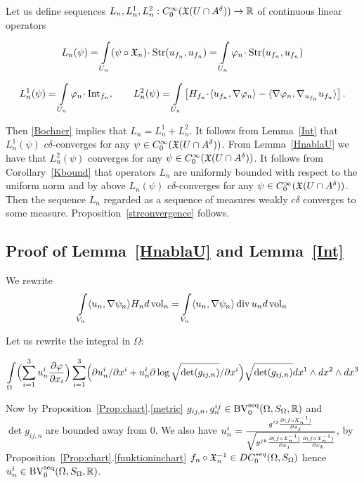 \documentclass[a4paper,10pt]{article}
\begin{document}
Let us define sequences 
$L_n, L_n^1, L_n^2:C^\infty_0(\X(U\cap A^\delta))\to \R$
of continuous linear operators

$$L_n(\psi)=
\int\limits_{U_n}(\psi\circ\mathfrak X_n )\cdot \Str(u_{f_n}, u_{f_n})=
\int\limits_{U_n} \phi_n\cdot \Str(u_{f_n}, u_{f_n})
$$

$$L_n^1(\psi)=
\int\limits_{U_n} \phi_n\cdot \Int_{f_n},
\qquad L_n^2(\psi)=
\int\limits_{U_n}
 \l[H_{f_n}\cdot\<u_{f_n},\nabla\phi_n\>- \<\nabla\phi_n,\nabla_{u_{f_n}} u_{f_n}\> \r].$$

Then \ref{Bochner} implies that $L_n=L_n^1+L_n^2$.
It follows from
Lemma~\ref{Int} that 
$L^1_n(\psi)$ $c\delta$-converges for any $\psi\in C^\infty_0(\X(U\cap A^\delta))$. From
Lemma~\ref{HnablaU} we have that
$L^2_n(\psi)$ converges for any $\psi\in C^\infty_0(\X(U\cap A^\delta))$.
It follows from Corollary~\ref{Kbound}  that operators $L_n$
are uniformly bounded with respect to the uniform norm and by above
$L_n(\psi)$ $c\delta$-converges for any $\psi\in C^\infty_0(\X(U\cap A^\delta))$.
Then  the sequence $L_n$ regarded as a sequence 
of measures weakly $c\delta$ converges to some 
measure. Proposition~\ref{strconvergence} follows.

\subsection{Proof of Lemma~\ref{HnablaU}
and Lemma~\ref{Int}}

We rewrite
$$\int\limits_{V_n} \<u_n,\nabla\psi_n\> H_nd\vol_n
=
\int\limits_{V_n} \<u_n,\nabla\psi_n\> \div u_nd\vol_n
$$

Let us
 rewrite the integral in $\Omega$:

$$\int\limits_{\Omega} \Bigl(\sum_{i=1}^3u_n^i \frac{\partial \phi}{\partial x_i}\Bigr)
\sum_{i=1}^3\Bigl(\partial u_n^i/ \partial x^i +u^i_n\partial \log \sqrt {\det (g_{ij,n})}/\partial x^i\Bigr)
\sqrt {\det (g_{ij,n})}dx^1\wedge dx^2\wedge dx^3$$

Now by Proposition~\ref{Prop:chart}.\ref{metric}
$g_{i j,n}, g^{ij}_n\in  \op{BV_0^{seq}}(\Omega,S_\Omega,\RR)$
and
$\det g_{ij,n}$ are bounded away from $0$.
We also have
$u_n^i=\frac{g^{ij}\frac{\partial (f\circ \X_n^{-1})}{ \partial x_j}}
{\sqrt{g^{jk}\frac{\partial (f\circ \X_n^{-1})}{\partial x_j }\frac{\partial (f\circ \X_n^{-1})}{\partial x_k}}}$,
 by Proposition~\ref{Prop:chart}.\ref{funktioninchart}
 $f_n\circ\X_n^{-1}\in DC_0^{seq}(\Omega, S_\Omega)$
hence 
${u^i_n}\in  \op{BV_0^{seq}}(\Omega,S_\Omega,\RR)$.
\end{document}
